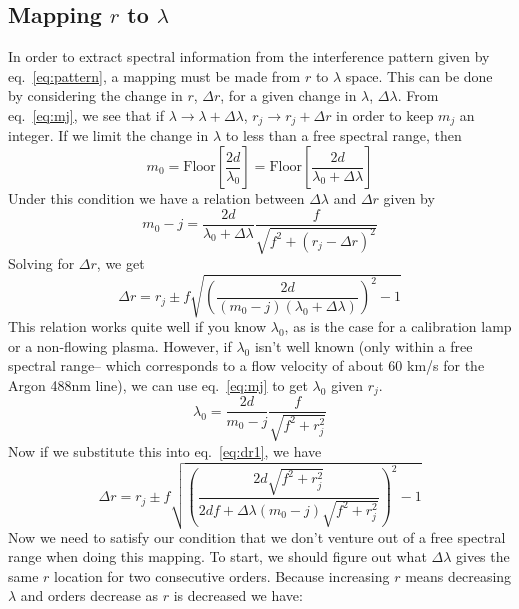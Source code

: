 \documentclass{article}
\begin{document}
\subsection*{Mapping $r$ to $\lambda$}
In order to extract spectral information from the interference pattern given by eq.~\ref{eq:pattern}, a mapping must be made from $r$ to $\lambda$ space. This can be done by considering the change in $r$, $\Delta r$, for a given change in $\lambda$, $\Delta\lambda$. From eq.~\ref{eq:mj}, we see that if $\lambda\rightarrow\lambda+\Delta\lambda$, $r_{j}\rightarrow r_{j}+\Delta r$ in order to keep $m_{j}$ an integer. If we limit the change in $\lambda$ to less than a free spectral range, then
\begin{equation}
m_{0}=\text{Floor}\left[\frac{2d}{\lambda_{0}}\right]=\text{Floor}\left[\frac{2d}{\lambda_{0}+\Delta\lambda}\right]
\end{equation}
Under this condition we have a relation between $\Delta\lambda$ and $\Delta r$ given by
\begin{equation}
m_{0}-j = \frac{2d}{\lambda_{0}+\Delta\lambda}\frac{f}{\sqrt{f^{2}+(r_{j}-\Delta r)^{2}}}
\end{equation}
Solving for $\Delta r$, we get
\begin{equation}
\Delta r = r_{j} \pm f \sqrt{\left(\frac{2d}{(m_{0}-j)(\lambda_{0}+\Delta\lambda)}\right)^{2}-1}
\label{eq:dr1}
\end{equation}
This relation works quite well if you know $\lambda_{0}$, as is the case for a calibration lamp or a non-flowing plasma. However, if $\lambda_{0}$ isn't well known (only within a free spectral range-- which corresponds to a flow velocity of about 60 km/s for the Argon 488nm line), we can use eq.~\ref{eq:mj} to get $\lambda_{0}$ given $r_{j}$.
\begin{equation}
\lambda_{0}=\frac{2d}{m_{0}-j}\frac{f}{\sqrt{f^{2}+r_{j}^{2}}}
\label{eq:lam_sub}
\end{equation}
Now if we substitute this into eq.~\ref{eq:dr1}, we have
\begin{equation}
\Delta r = r_{j} \pm f\sqrt{\left(\frac{2d\sqrt{f^{2}+r_{j}^{2}}}{2df+\Delta\lambda(m_{0}-j)\sqrt{f^{2}+r_{j}^{2}}}\right)^{2}-1}
\label{eq:dr2}
\end{equation}
Now we need to satisfy our condition that we don't venture out of a free spectral range when doing this mapping. To start, we should figure out what $\Delta\lambda$ gives the same $r$ location for two consecutive orders. Because increasing $r$ means decreasing $\lambda$ and orders decrease as $r$ is decreased we have:
\end{document}
